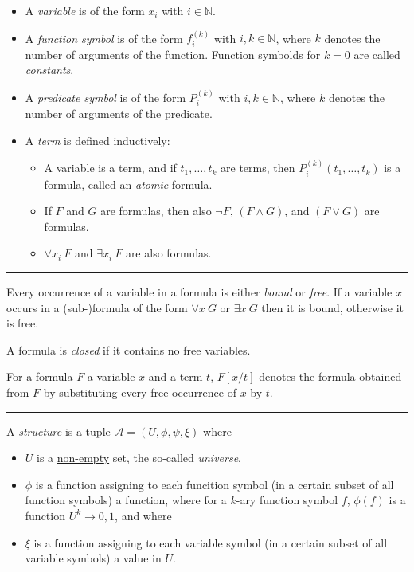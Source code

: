 \documentclass[a4paper]{extarticle}
\newcommand{\N}{\mathbb{N}}
\newcommand{\cA}{\mathcal{A}}
\newcommand{\sep}{\vspace{5pt}\noindent\hrule\vspace{5pt}}
\begin{document}
\begin{multicols*}{2}
\Def[Syntax]
\begin{itemize}
  \item A \emph{variable} is of the form $x_i$ with $i\in \N$.
  \item A \emph{function symbol} is of the form $f_i^{(k)}$ with $i,k\in\N$,
  where $k$ denotes the number of arguments of the function. Function symbolds
  for $k=0$ are called \emph{constants}.
  \item A \emph{predicate symbol} is of the form $P_i^{(k)}$ with $i,k\in\N$,
  where $k$ denotes the number of arguments of the predicate.
  \item A \emph{term} is defined inductively: 
  \begin{itemize}
    \item A variable is a term, and if $t_1,\ldots,t_k$ are terms, then
    $P_i^{(k)}(t_1,\ldots,t_k)$ is a formula, called an \emph{atomic} formula.
    \item If $F$ and $G$ are formulas, then also $\lnot F$, $(F\land G)$, and
    $(F\lor G)$ are formulas.
    \item $\forall x_i \ F$ and $\exists x_i \ F$ are also formulas.
  \end{itemize}
\end{itemize}

\sep

 Every occurrence of a variable in a formula is
either \emph{bound} or \emph{free}. If a variable $x$ occurs in a (sub-)formula
of the form $\forall x \ G$ or $\exists x \ G$ then it is bound, otherwise it is
free.

 A formula is \emph{closed} if it contains no free
variables.

 For a formula $F$ a variable $x$ and a term
$t$, $F[x/t]$ denotes the formula obtained from $F$ by substituting every free
occurrence of $x$ by $t$.

\sep

\Def[Structure] A \emph{structure} is a tuple $\cA=(U,\phi,\psi,\xi)$ where
\begin{itemize}
  \item $U$ is a \underline{non-empty} set, the so-called \emph{universe},
  \item $\phi$ is a function assigning to each funcition symbol (in a certain
  subset of all function symbols) a function, where for a $k$-ary function
  symbol $f$, $\phi(f)$ is a function $U^k\to{0,1}$, and where
  \item $\xi$ is a function assigning to each variable symbol (in a
  certain subset of all variable symbols) a value in $U$.
\end{itemize}


\end{multicols*}
\end{document}
